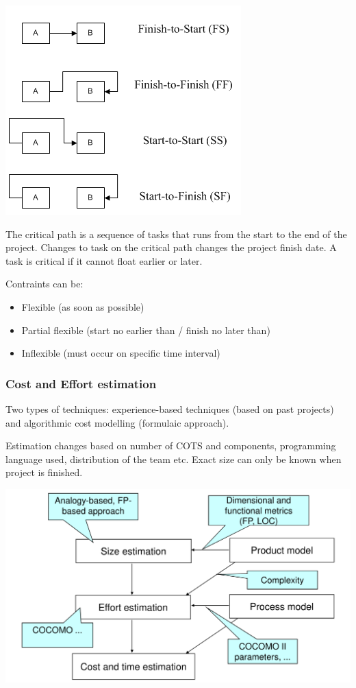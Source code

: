 \begin{center}
    \includegraphics[width=0.6\linewidth]{8-project-management/tasks-dependencies.png}
\end{center}

The critical path is a sequence of tasks that runs from the start to the end of the project.
Changes to task on the critical path changes the project finish date.
A task is critical if it cannot float earlier or later.

Contraints can be:
\begin{itemize}
    \item Flexible (as soon as possible)
    \item Partial flexible (start no earlier than / finish no later than)
    \item Inflexible (must occur on specific time interval)
\end{itemize}

\subsubsection{Cost and Effort estimation}
Two types of techniques: experience-based techniques (based on past projects) and algorithmic cost modelling (formulaic approach).

Estimation changes based on number of COTS and components, programming language used, distribution of the team etc.
Exact size can only be known when project is finished.
\begin{center}
    \includegraphics[width=\linewidth]{8-project-management/estimation.png}
\end{center}

